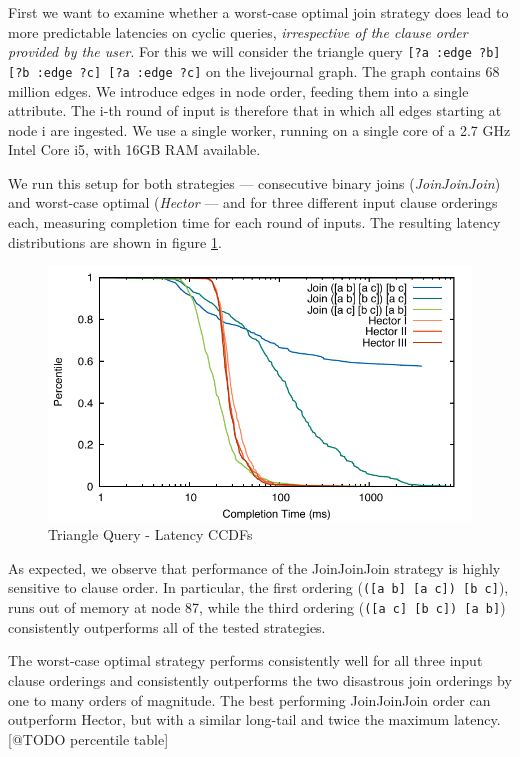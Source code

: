 \documentclass[../catalog.tex]{subfiles}
\begin{document}
First we want to examine whether a worst-case optimal join strategy
does lead to more predictable latencies on cyclic queries,
\emph{irrespective of the clause order provided by the user}. For this
we will consider the triangle query \texttt{[?a :edge ?b] [?b :edge
    ?c] [?a :edge ?c]} on the livejournal graph. The graph contains 68
million edges. We introduce edges in node order, feeding them into a
single attribute. The i-th round of input is therefore that in which
all edges starting at node i are ingested. We use a single worker,
running on a single core of a 2.7 GHz Intel Core i5, with 16GB RAM
available.

We run this setup for both strategies — consecutive binary joins
(\emph{JoinJoinJoin}) and worst-case optimal (\emph{Hector} — and for
three different input clause orderings each, measuring completion time
for each round of inputs. The resulting latency distributions are
shown in figure \ref{fig:triangle-cdfs}.

\begin{figure}[h!]
  \includegraphics[width=1.0\linewidth]{results/triangles/out/all_cdfs}
  \caption{Triangle Query - Latency CCDFs}
  \label{fig:triangle-cdfs}
\end{figure}

As expected, we observe that performance of the JoinJoinJoin strategy
is highly sensitive to clause order. In particular, the first ordering
(\texttt{([a b] [a c]) [b c]}), runs out of memory at node 87, while
the third ordering (\texttt{([a c] [b c]) [a b]}) consistently
outperforms all of the tested strategies.

The worst-case optimal strategy performs consistently well for all
three input clause orderings and consistently outperforms the two
disastrous join orderings by one to many orders of magnitude. The best
performing JoinJoinJoin order can outperform Hector, but with a
similar long-tail and twice the maximum latency. [@TODO percentile
  table]
\end{document}
